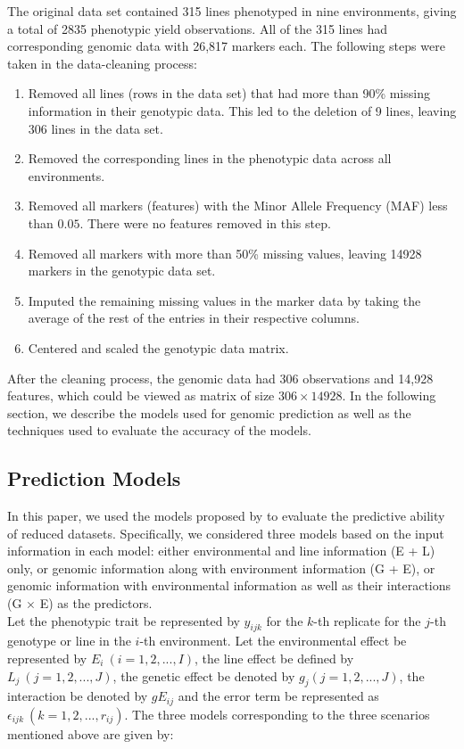 The original data set contained 315 lines phenotyped in nine environments, giving a total of 2835 phenotypic yield observations. All of the 315 lines had corresponding genomic data with 26,817 markers each. The following steps were taken in the data-cleaning process:

\begin{enumerate}
    \item Removed all lines (rows in the data set) that had more than 90\% missing information in their genotypic data. This led to the deletion of 9 lines, leaving 306 lines in the data set.
    \item Removed the corresponding lines in the phenotypic data across all environments. 
    \item Removed all markers (features) with the Minor Allele Frequency (MAF) less than $0.05$. There were no features removed in this step. \item Removed all markers with more than 50\% missing values, leaving 14928 markers in the genotypic data set. 
    \item Imputed the remaining missing values in the marker data by taking the average of the rest of the entries in their respective columns. 
    \item Centered and scaled the genotypic data matrix.  
\end{enumerate}

After the cleaning process, the genomic data had 306 observations and 14,928 features, which could be viewed as matrix of size $306 \times 14928$. In the following section, we describe the models used for genomic prediction as well as the techniques used to evaluate the accuracy of the models. 

\subsection{Prediction Models}

In this paper, we used the models proposed by \cite{jarquin_reaction_2014} to evaluate  the predictive ability of reduced datasets. Specifically, we considered three models based on the input information in each model: either environmental and line information (E + L) only, or genomic information along with environment information (G + E), or genomic information with environmental information as well as their interactions (G $\times$ E) as the predictors. \\

Let the phenotypic trait be represented by $y_{ijk}$ for the $k$-th replicate for the $j$-th genotype or line in the $i$-th environment. Let the environmental effect be represented by $E_i \ (i = 1, 2, ..., I)$, the line effect be defined by $L_j \ (j = 1, 2, ..., J)$, the genetic effect be denoted by $g_j (j = 1, 2, ..., J)$, the interaction be denoted by $gE_{ij}$ and the error term be represented as $\epsilon_{ijk} \ (k = 1, 2, ..., r_{ij})$. The three models corresponding to the three scenarios mentioned above are given by:

